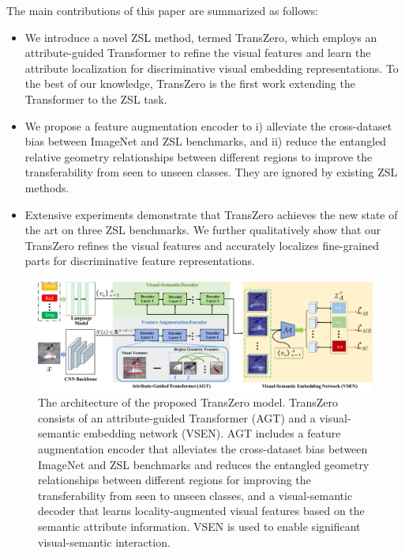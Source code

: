 \documentclass[letterpaper]{article} %
\begin{document}
	The main contributions of this paper are summarized as follows:
	
	\begin{itemize}
		\item We introduce a novel ZSL method, termed TransZero, which employs an attribute-guided Transformer to refine the visual features and learn the attribute localization for discriminative visual embedding representations. To the best of our knowledge, TransZero is the first work extending the Transformer to the ZSL task.
		
		\item We propose a feature augmentation encoder to i) alleviate the cross-dataset bias between ImageNet and ZSL benchmarks, and ii) reduce the entangled relative geometry relationships between different regions to improve the transferability from seen to unseen classes. They are ignored by existing ZSL methods. 
		
		\item  Extensive experiments demonstrate that TransZero achieves the new state of the art on three ZSL benchmarks. We further qualitatively show that our TransZero refines the visual features and accurately localizes fine-grained parts for discriminative feature representations.
	\end{itemize}
	
	
	\begin{figure}[ht]
		\centering
		\includegraphics[scale=0.34]{figures/pipeline.pdf}\vspace{-3mm}
		\caption{The architecture of the proposed TransZero model. TransZero consists of an attribute-guided Transformer (AGT) and a visual-semantic embedding network (VSEN). AGT includes a feature augmentation encoder that alleviates the cross-dataset bias between ImageNet and ZSL benchmarks and reduces the entangled geometry relationships between different regions for improving the transferability from seen to unseen classes, and a visual-semantic decoder that learns locality-augmented visual features based on the semantic attribute information. VSEN is used to enable significant visual-semantic interaction.}
		\label{fig:pipeline}\vspace{-6mm}
	\end{figure}
\end{document}
